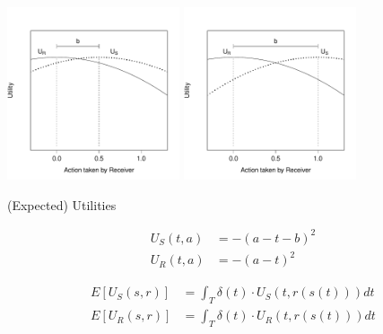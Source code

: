 \documentclass[compress]{beamer}
\begin{document}
\begin{frame}{\cite{crawford-sobel:1982}}
\begin{center}
     \includegraphics[width=2in]{payoffgraph2.pdf} \hspace{.5cm} \includegraphics[width=2in]{payoffgraph.pdf}
\end{center}
\end{frame}

\begin{frame}{(Expected) Utilities}
\begin{block}{}
 \begin{equation}
\begin{split}
     U_S(t, a) &= -(a - t - b)^2\\
  	 U_R(t, a) &= -(a - t)^2
\end{split}
\end{equation}
\end{block}

\begin{block}{}
	\begin{equation}
	    \begin{split}
	      E[U_{S}(s,r)] &= \int_{T} \delta (t) \cdot U_S(t, r(s(t)))dt\\
	      E[U_{R}(s,r)] &= \int_{T} \delta (t) \cdot U_R(t, r(s(t)))dt
	    \end{split}
	\end{equation}
\end{block}
\end{frame}
\end{document}
